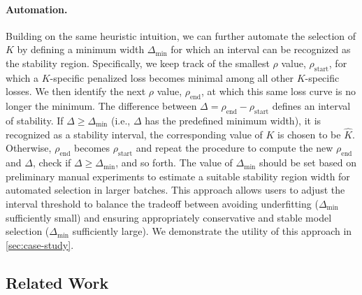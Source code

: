 \paragraph{Automation.}
Building on the same heuristic intuition, we can further automate the selection of $K$  by defining a minimum width $\Delta_{\min}$ for which an interval can be recognized as the stability region. Specifically,
we keep track of the smallest $\rho$ value, $\rho_\mathrm{start}$, for which a $K$-specific penalized loss becomes minimal among all other $K$-specific losses.
We then identify the next $\rho$ value, $\rho_\mathrm{end}$, at which this same loss curve is no longer the minimum.
The difference between $\Delta = \rho_\mathrm{end} - \rho_\mathrm{start}$ defines an interval of stability.
If $\Delta \ge \Delta_{\min}$ (i.e., $\Delta$ has the predefined minimum width), it is recognized as a stability interval, the corresponding value of $K$ is chosen to be $\widehat K$. Otherwise, $\rho_\mathrm{end}$ becomes $\rho_\mathrm{start}$
and repeat the procedure to compute the new $\rho_\mathrm{end}$ and $\Delta$, check if $\Delta \ge \Delta_{\min}$, and so forth.
The value of $\Delta_{\min}$ should be set based on preliminary manual experiments to estimate a suitable stability region width for automated selection in larger batches. This approach allows users to adjust the interval threshold to balance the tradeoff between avoiding underfitting ($\Delta_{\min}$ sufficiently small) and ensuring appropriately conservative and stable model selection ($\Delta_{\min}$ sufficiently large).
We demonstrate the utility of this approach in \cref{sec:case-study}. %

\subsection{Related Work} \label{sec:related-work}

